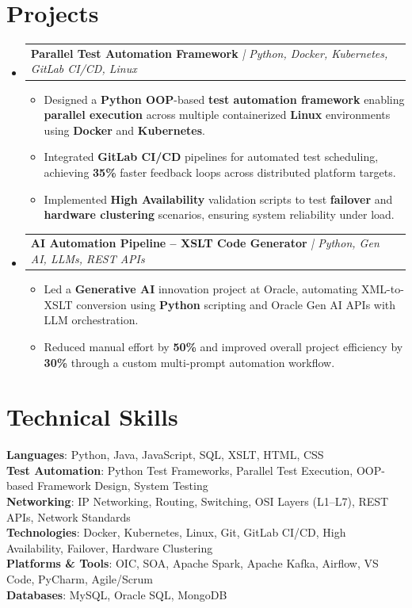 \documentclass[letterpaper,11pt]{article}
\makeatletter
\newcommand{\resumeItem}[1]{
  \item\small{
    {#1 \vspace{-2pt}}
  }
}
\newcommand{\resumeProjectHeading}[2]{
    \item
    \begin{tabular*}{0.97\textwidth}{l@{\extracolsep{\fill}}r}
      \small#1 & #2 \\
    \end{tabular*}\vspace{-7pt}
}
\newcommand{\resumeSubHeadingListStart}{\begin{itemize}[leftmargin=0.15in, label={}]}
\newcommand{\resumeSubHeadingListEnd}{\end{itemize}}
\newcommand{\resumeItemListStart}{\begin{itemize}}
\newcommand{\resumeItemListEnd}{\end{itemize}\vspace{-5pt}}
\makeatother
\begin{document}
\section{Projects}
\resumeSubHeadingListStart
    \resumeProjectHeading
        {\textbf{Parallel Test Automation Framework} \textit{| Python, Docker, Kubernetes, GitLab CI/CD, Linux}}{}
    \resumeItemListStart
        \resumeItem{Designed a \textbf{Python OOP}-based \textbf{test automation framework} enabling \textbf{parallel execution} across multiple containerized \textbf{Linux} environments using \textbf{Docker} and \textbf{Kubernetes}.}
        \resumeItem{Integrated \textbf{GitLab CI/CD} pipelines for automated test scheduling, achieving \textbf{35\%} faster feedback loops across distributed platform targets.}
        \resumeItem{Implemented \textbf{High Availability} validation scripts to test \textbf{failover} and \textbf{hardware clustering} scenarios, ensuring system reliability under load.}
    \resumeItemListEnd
    \resumeProjectHeading
        {\textbf{AI Automation Pipeline -- XSLT Code Generator} \textit{| Python, Gen AI, LLMs, REST APIs}}{}
    \resumeItemListStart
        \resumeItem{Led a \textbf{Generative AI} innovation project at Oracle, automating XML-to-XSLT conversion using \textbf{Python} scripting and Oracle Gen AI APIs with LLM orchestration.}
        \resumeItem{Reduced manual effort by \textbf{50\%} and improved overall project efficiency by \textbf{30\%} through a custom multi-prompt automation workflow.}
    \resumeItemListEnd
\resumeSubHeadingListEnd

\section{Technical Skills}
\begin{itemize}[leftmargin=0.15in, label={}]
    \small{\item{
        \textbf{Languages}{: Python, Java, JavaScript, SQL, XSLT, HTML, CSS} \\
        \textbf{Test Automation}{: Python Test Frameworks, Parallel Test Execution, OOP-based Framework Design, System Testing} \\
        \textbf{Networking}{: IP Networking, Routing, Switching, OSI Layers (L1--L7), REST APIs, Network Standards} \\
        \textbf{Technologies}{: Docker, Kubernetes, Linux, Git, GitLab CI/CD, High Availability, Failover, Hardware Clustering} \\
        \textbf{Platforms \& Tools}{: OIC, SOA, Apache Spark, Apache Kafka, Airflow, VS Code, PyCharm, Agile/Scrum} \\
        \textbf{Databases}{: MySQL, Oracle SQL, MongoDB}
    }}
\end{itemize}
\end{document}

